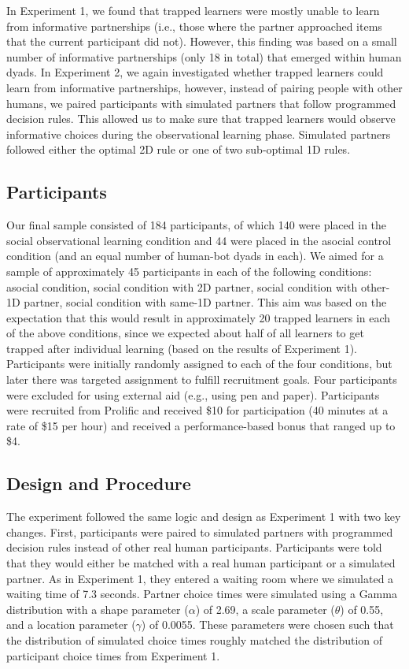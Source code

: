 \documentclass[11pt]{article} %
\begin{document}
In Experiment 1, we found that trapped learners were mostly unable to learn from informative partnerships (i.e., those where the partner approached items that the current participant did not). However, this finding was based on a small number of informative partnerships (only 18 in total) that emerged within human dyads. In Experiment 2, we again investigated whether trapped learners could learn from informative partnerships, however, instead of pairing people with other humans, we paired participants with simulated partners that follow programmed decision rules. This allowed us to make sure that trapped learners would observe informative choices during the observational learning phase. Simulated partners followed either the optimal 2D rule or one of two sub-optimal 1D rules. 


\subsection{Participants}

Our final sample consisted of 184 participants, of which 140 were placed in the social observational learning condition and 44 were placed in the asocial control condition (and an equal number of human-bot dyads in each). We aimed for a sample of approximately 45 participants in each of the following conditions: asocial condition, social condition with 2D partner, social condition with other-1D partner, social condition with same-1D partner. This aim was based on the expectation that this would result in approximately 20 trapped learners in each of the above conditions, since we expected about half of all learners to get trapped after individual learning (based on the results of Experiment 1). Participants were initially randomly assigned to each of the four conditions, but later there was targeted assignment to fulfill recruitment goals. Four participants were excluded for using external aid (e.g., using pen and paper). Participants were recruited from Prolific and received \$10 for participation (40 minutes at a rate of \$15 per hour) and received a performance-based bonus that ranged up to \$4.


\subsection{Design and Procedure}

The experiment followed the same logic and design as Experiment 1 with two key changes. First, participants were paired to simulated partners with programmed decision rules instead of other real human participants. Participants were told that they would either be matched with a real human participant or a simulated partner. As in Experiment 1, they entered a waiting room where we simulated a waiting time of 7.3 seconds. Partner choice times were simulated using a Gamma distribution with a shape parameter ($\alpha$) of 2.69, a scale parameter ($\theta$) of 0.55, and a location parameter ($\gamma$) of 0.0055. These parameters were chosen such that the distribution of simulated choice times roughly matched the distribution of participant choice times from Experiment 1. 
\end{document}

